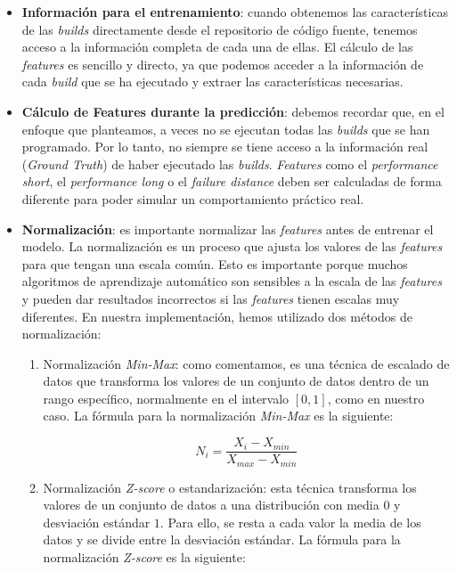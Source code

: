 \begin{itemize}
    \item \textbf{Información para el entrenamiento}: cuando obtenemos las características de las \textit{builds}
    directamente desde el repositorio de código fuente, tenemos acceso a la información completa
    de cada una de ellas. El cálculo de las \textit{features} es sencillo y directo, ya que
    podemos acceder a la información de cada \textit{build} que se ha ejecutado y extraer las
    características necesarias.\\
    
    \item \textbf{Cálculo de Features durante la predicción}: debemos recordar que, en el
    enfoque que planteamos, a veces no se ejecutan todas las \textit{builds} que se han
    programado. Por lo tanto, no siempre se tiene acceso a la información real (\textit{Ground
    Truth}) de haber ejecutado las \textit{builds}. \textit{Features} como el \textit{performance
    short}, el \textit{performance long} o el \textit{failure distance} deben ser calculadas
    de forma diferente para poder simular un comportamiento práctico real.\\

    \item \textbf{Normalización}: es importante normalizar las \textit{features} antes de
    entrenar el modelo. La normalización es un proceso que ajusta los valores de las
    \textit{features} para que tengan una escala común. Esto es importante porque muchos
    algoritmos de aprendizaje automático son sensibles a la escala de las \textit{features} y
    pueden dar resultados incorrectos si las \textit{features} tienen escalas muy diferentes.
    En nuestra implementación, hemos utilizado dos métodos de normalización:

    \begin{enumerate}
        \item Normalización \textit{Min-Max}: como comentamos, es una técnica de escalado de datos
        que transforma los valores de un conjunto de datos dentro de un rango específico,
        normalmente en el intervalo $[0, 1]$, como en nuestro caso. La fórmula para la
        normalización \textit{Min-Max} es la siguiente:

        \begin{equation}
            N_{i} = \frac{X_{i} - X_{min}}{X_{max} - X_{min}}
        \end{equation}

        \item Normalización \textit{Z-score} o estandarización: esta técnica transforma los
        valores de un conjunto de datos a una distribución con media $0$ y desviación estándar $1$.
        Para ello, se resta a cada valor la media de los datos y se divide entre la desviación
        estándar. La fórmula para la normalización \textit{Z-score} es la siguiente:


\end{enumerate}
\end{itemize}
